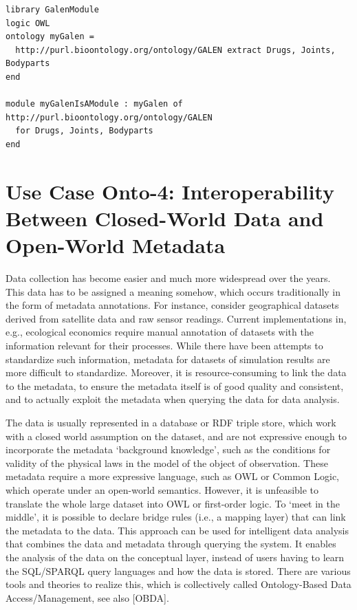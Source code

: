 \documentclass[10pt,fleqn,%
\ifpretendfinal
final%
\else
draft%
\fi,
]{scrreprt}
\newcommand*{\termref}[1]{\index{#1}#1\xspace}
\begin{document}
\begin{lstlisting}[basicstyle=\ttfamily,language=dolText,morekeywords={props,ObjectProperty,Class,DisjointUnionOf,SubClassOf,Characteristics,Transitive,Asymmetric,SubPropertyOf,DisjointClasses,EquivalentTo,inverse,only,forall,iff,if,or,exists,distributed,extract},escapechar=@,mathescape]
library GalenModule
logic OWL
ontology myGalen = 
  http://purl.bioontology.org/ontology/GALEN extract Drugs, Joints, Bodyparts
end

module myGalenIsAModule : myGalen of http://purl.bioontology.org/ontology/GALEN 
  for Drugs, Joints, Bodyparts
end
\end{lstlisting}
 


\section{Use Case Onto-4: Interoperability Between Closed-World Data and Open-World Metadata}
Data collection has become easier and much more widespread over the years. This data has to be 
assigned a meaning somehow, which occurs traditionally in the  form of metadata annotations. For 
instance, consider geographical datasets derived from satellite data and raw sensor readings. 
Current implementations in, e.g., ecological economics\cite{bagstad_aries_2011} require manual 
annotation of datasets with the information relevant for their processes. While there have been 
attempts to standardize such information\cite{european_comission_inspire_2014}, metadata for 
datasets of simulation results are more difficult to standardize. Moreover, it is 
resource-consuming to link the data to the metadata, to ensure the metadata itself is of good 
quality and consistent, and to actually exploit the metadata when querying the data for data 
analysis. 

The data is usually represented in a database or RDF triple store, which work with a \termref{closed world assumption} on the dataset, and are not expressive enough to 
incorporate the metadata `background knowledge', such as the conditions for validity of the physical laws in the model of the object of observation. These metadata 
require a more expressive language, such as OWL or Common Logic, which operate under an open-world semantics. However, it is unfeasible to translate the 
whole large dataset into OWL or first-order logic. To `meet in the middle', it is possible to declare bridge rules (i.e., a mapping layer) that can link the metadata to 
the data. This approach can be used for intelligent data analysis that combines the data and metadata through querying the system. It enables the analysis of the 
data on the conceptual layer, instead of users having to learn the SQL/SPARQL query languages and how the data is stored. There are various tools and theories 
to realize this, which is collectively called Ontology-Based Data Access/Management, see also [OBDA].
\end{document}

